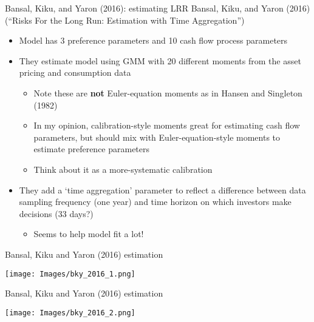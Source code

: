 \documentclass[xcolor=table, aspectratio=169]{beamer}
\newcommand{\alertbf}[1]{\alert{\textbf{#1}}}
\begin{document}
\begin{frame}{Bansal, Kiku, and Yaron (2016): estimating LRR}
Bansal, Kiku, and Yaron (2016) (``Risks For the Long Run: Estimation with Time Aggregation'')

\begin{itemize}
\item Model has 3 preference parameters and 10 cash flow process parameters
\item They estimate model using GMM with 20 different moments from the asset pricing and consumption data
\begin{itemize}
\item Note these are \alertbf{not} Euler-equation moments as in Hansen and Singleton (1982)
\item In my opinion, calibration-style moments great for estimating cash flow parameters, but should mix with Euler-equation-style moments to estimate preference parameters
\item Think about it as a more-systematic calibration
\end{itemize}
\item They add a `time aggregation' parameter to reflect a difference between data sampling frequency (one year) and time horizon on which investors make decisions (33 days?)
\begin{itemize}
\item Seems to help model fit a lot!
\end{itemize}
\end{itemize}
\end{frame}

\begin{frame}{Bansal, Kiku and Yaron (2016) estimation}
\begin{center}
\texttt{[image: Images/bky\_2016\_1.png]}
\end{center}
\end{frame}

\begin{frame}{Bansal, Kiku and Yaron (2016) estimation}
\begin{center}
\texttt{[image: Images/bky\_2016\_2.png]}
\end{center}
\end{frame}
\end{document}
